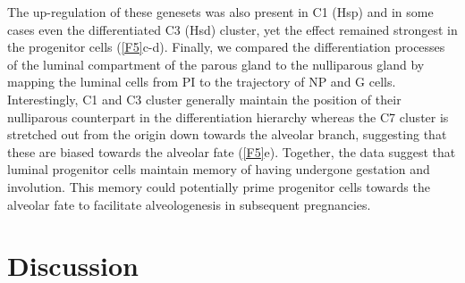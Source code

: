 \documentclass[titlepage, 12pt, oneside]{amsart}
\begin{document}
The up-regulation of these genesets was also present in C1 (Hsp) and in some cases even the differentiated C3 (Hsd) cluster, yet the effect remained strongest in the progenitor cells (\autoref{F5}c-d).
Finally, we compared the differentiation processes of the luminal compartment of the parous gland to the nulliparous gland by mapping the luminal cells from PI to the trajectory of NP and G cells.
Interestingly, C1 and C3 cluster generally maintain the position of their nulliparous counterpart in the differentiation hierarchy whereas the C7 cluster is stretched out from the origin down towards the alveolar branch, suggesting that these are biased towards the alveolar fate (\autoref{F5}e).
Together, the data suggest that luminal progenitor cells maintain memory of having undergone gestation and involution.
This memory could potentially prime progenitor cells towards the alveolar fate to facilitate alveologenesis in subsequent pregnancies.

\section{Discussion}
\end{document}
